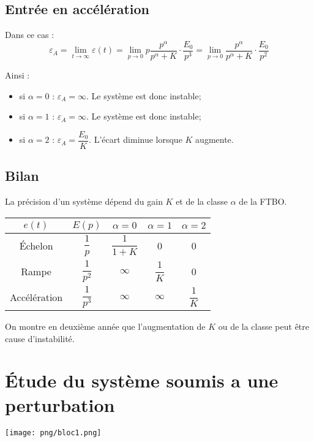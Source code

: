 \documentclass[10pt,oneside]{article}
\begin{document}
\subsection{Entrée en accélération}
Dans ce cas : 
$$
\varepsilon_A =
\lim\limits_{t\to \infty} \varepsilon(t) 
= \lim\limits_{p\to 0} p \dfrac{p^\alpha}{p^\alpha+K} \cdot \dfrac{E_0}{p^3}
= \lim\limits_{p\to 0}  \dfrac{p^\alpha}{p^\alpha+K} \cdot \dfrac{E_0}{p^2}
$$

Ainsi :
\begin{itemize}
\item si $\alpha=0$ : $\varepsilon_A = \infty$. Le système est donc instable;
\item si $\alpha=1$ : $\varepsilon_A = \infty$. Le système est donc instable;
\item si $\alpha=2$ : $\varepsilon_A = \dfrac{E_0}{K}$. L'écart diminue lorsque $K$ augmente.
\end{itemize}

\newpage 

\subsection{Bilan}

\begin{resultat}
La précision d'un système dépend du gain $K$ et de la classe $\alpha$ de la FTBO. 
\begin{center}
\begin{tabular}{|c|c|c|c|c|}
\hline
$e(t)$ & $E(p)$ & $\alpha=0$ & $\alpha=1 $ & $\alpha=2$ \\
\hline
Échelon & $\dfrac{1}{p}$ & $\dfrac{1}{1+K}$ & 0 & 0 \\
\hline
Rampe & $\dfrac{1}{p^2}$ & $\infty$ & $\dfrac{1}{K}$ & 0 \\
\hline
Accélération & $\dfrac{1}{p^3}$ & $\infty$ & $\infty$ & $\dfrac{1}{K}$ \\
\hline
\end{tabular}
\end{center}
\end{resultat}

\begin{rem}
On montre en deuxième année que l'augmentation de $K$ ou de la classe peut être cause d'instabilité.
\end{rem}


\section{Étude du système soumis a une perturbation}
\begin{center}
\texttt{[image: png/bloc1.png]}
\end{center}
\end{document}
